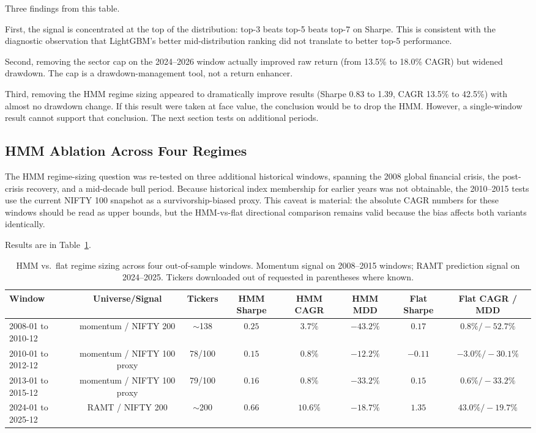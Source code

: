 \documentclass[conference]{IEEEtran}
\begin{document}
Three findings from this table.

First, the signal is concentrated at the top of the distribution: top-3 beats top-5 beats top-7 on Sharpe. This is consistent with the diagnostic observation that LightGBM's better mid-distribution ranking did not translate to better top-5 performance.

Second, removing the sector cap on the 2024--2026 window actually improved raw return (from 13.5\% to 18.0\% CAGR) but widened drawdown. The cap is a drawdown-management tool, not a return enhancer.

Third, removing the HMM regime sizing appeared to dramatically improve results (Sharpe 0.83 to 1.39, CAGR 13.5\% to 42.5\%) with almost no drawdown change. If this result were taken at face value, the conclusion would be to drop the HMM. However, a single-window result cannot support that conclusion. The next section tests on additional periods.

\subsection{HMM Ablation Across Four Regimes}

The HMM regime-sizing question was re-tested on three additional historical windows, spanning the 2008 global financial crisis, the post-crisis recovery, and a mid-decade bull period. Because historical index membership for earlier years was not obtainable, the 2010--2015 tests use the current NIFTY 100 snapshot as a survivorship-biased proxy. This caveat is material: the absolute CAGR numbers for these windows should be read as upper bounds, but the HMM-vs-flat directional comparison remains valid because the bias affects both variants identically.

Results are in Table~\ref{tab:four-windows}.

\begin{table}[htbp]
\caption{HMM vs.\ flat regime sizing across four out-of-sample windows. Momentum signal on 2008--2015 windows; RAMT prediction signal on 2024--2025. Tickers downloaded out of requested in parentheses where known.}
\label{tab:four-windows}
\centering
\small
\begin{tabular}{lccccccc}
\toprule
\textbf{Window} & \textbf{Universe/Signal} & \textbf{Tickers} & \textbf{HMM Sharpe} & \textbf{HMM CAGR} & \textbf{HMM MDD} & \textbf{Flat Sharpe} & \textbf{Flat CAGR / MDD} \\
\midrule
2008-01 to 2010-12 & momentum / NIFTY 200 & $\sim$138 & $0.25$ & $3.7\%$ & $-43.2\%$ & $0.17$ & $0.8\% / -52.7\%$ \\
2010-01 to 2012-12 & momentum / NIFTY 100 proxy & 78/100 & $0.15$ & $0.8\%$ & $-12.2\%$ & $-0.11$ & $-3.0\% / -30.1\%$ \\
2013-01 to 2015-12 & momentum / NIFTY 100 proxy & 79/100 & $0.16$ & $0.8\%$ & $-33.2\%$ & $0.15$ & $0.6\% / -33.2\%$ \\
2024-01 to 2025-12 & RAMT / NIFTY 200 & $\sim$200 & $0.66$ & $10.6\%$ & $-18.7\%$ & $1.35$ & $43.0\% / -19.7\%$ \\
\bottomrule
\end{tabular}
\end{table}
\end{document}
